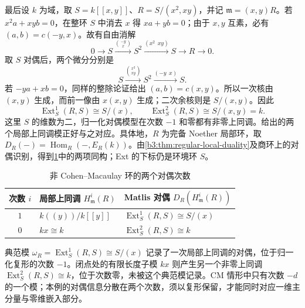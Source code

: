 \ProseParagraphBreak
最后设 \(k\) 为域，取 \(S=k[\![x,y]\!]\)、\(R=S/(x^2,xy)\)，并记 \(\mathfrak m=(x,y)R\)。若 \(x^2a+xyb=0\)，在整环 \(S\) 中消去 \(x\) 得 \(xa+yb=0\)；由于 \(x,y\) 互素，必有 \((a,b)=c(-y,x)\)。故有自由消解
\[
	0\longrightarrow S\xrightarrow{\binom{-y}{x}}S^2 \xrightarrow{(x^2\ \ xy)}S\longrightarrow R\longrightarrow0.
\]
取 \(S\) 对偶后，两个微分分别是
\[
	S\xrightarrow{\binom{x^2}{xy}}S^2 \xrightarrow{(-y\ \ x)}S.
\]
若 \(-ya+xb=0\)，同样的整除论证给出 \((a,b)=c(x,y)\)。所以一次核由 \((x,y)\) 生成，而前一像由 \(x(x,y)\) 生成；二次余核则是 \(S/(x,y)\)。因此
\[
	\operatorname{Ext}_S^1(R,S)\cong S/(x),\qquad \operatorname{Ext}_S^2(R,S)\cong S/(x,y)=k.
\]
这里 \(S\) 的维数为二，归一化对偶模型在次数 \(-1\) 和零都有非零上同调。给出的两个局部上同调模正好与之对应。具体地，\(R\) 为完备 Noether 局部环，取 \(D_R(-)=\operatorname{Hom}_R(-,E_R(k))\)。由\cref{b3:thm:regular-local-duality}及商环上的对偶识别，得到\cref{b3:tab:non-cm-dual-degrees}中的两项同构；Ext 的下标仍是环境环 \(S\)。

\begin{table}[htbp]
	\centering
	\caption{非 Cohen--Macaulay 环的两个对偶次数}
	\label{b3:tab:non-cm-dual-degrees}
	\begin{tabularx}{\linewidth}{@{}cXX@{}}
		\toprule
		次数 \(i\) & 局部上同调 \(H^i_{\mathfrak m}(R)\) & Matlis 对偶 \(D_R(H^i_{\mathfrak m}(R))\) \\
		\midrule
		\(1\) & \(k(\!(y)\!)/k[\![y]\!]\) & \(\operatorname{Ext}_S^1(R,S)\cong S/(x)\) \\
		\(0\) & \(kx\cong k\) & \(\operatorname{Ext}_S^2(R,S)\cong k\) \\
		\bottomrule
	\end{tabularx}
\end{table}

典范模 \(\omega_R=\operatorname{Ext}_S^1(R,S)\cong S/(x)\) 记录了一次局部上同调的对偶，位于归一化复形的次数 \(-1\)。闭点处的有限长度子模 \(kx\) 则产生另一个非零上同调 \(\operatorname{Ext}_S^2(R,S)\cong k\)，位于次数零，未被这个典范模记录。CM 情形中只有次数 \(-d\) 的一个模；本例的对偶信息分散在两个次数，须以复形保留，才能同时对应一维主分量与零维嵌入部分。
